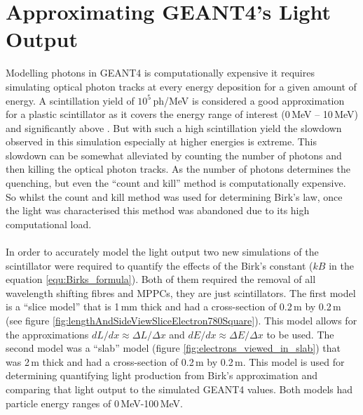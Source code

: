 \section{Approximating GEANT4's Light Output}\label{sec:GEANT4Simulation_MonteCarloBirksLaw}
Modelling photons in GEANT4 is computationally expensive it requires simulating optical photon tracks at every energy deposition for a given amount of energy. A scintillation yield of $10^5$\,ph/MeV is considered a good approximation for a plastic scintillator as it covers the energy range of interest (0\,MeV -- 10\,MeV) and significantly above \cite{craun_1970}. But with such a high scintillation yield the slowdown observed in this simulation especially at higher energies is extreme. This slowdown can be somewhat alleviated by counting the number of photons and then killing the optical photon tracks. As the number of photons determines the quenching, but even the ``count and kill'' method is computationally expensive. So whilst the count and kill method was used for determining Birk's law, once the light was characterised this method was abandoned due to its high computational load.
\\\\In order to accurately model the light output two new simulations of the scintillator were required to quantify the effects of the Birk's constant ($kB$ in the equation \ref{equ:Birks_formula}). Both of them required the removal of all wavelength shifting fibres and MPPCs, they are just scintillators. The first model is a ``slice model'' that is 1\,mm thick and had a cross-section of 0.2\,m by 0.2\,m (see figure \ref{fig:lengthAndSideViewSliceElectron780Square}). This model allows for the approximations $dL/dx \approx \Delta L / \Delta x$ and $dE/dx \approx \Delta E / \Delta x$ to be used. The second model was a ``slab'' model (figure \ref{fig:electrons_viewed_in_slab}) that was 2\,m thick and had a cross-section of 0.2\,m by 0.2\,m. This model is used for determining quantifying light production from Birk's approximation and comparing that light output to the simulated GEANT4 values. Both models had particle energy ranges of 0\,MeV-100\,MeV.

